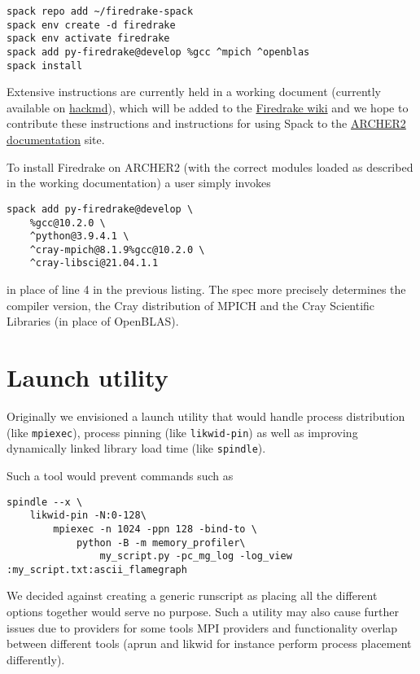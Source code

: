\documentclass[a4paper,11pt]{article}
\begin{document}
\begin{lstlisting}
spack repo add ~/firedrake-spack
spack env create -d firedrake
spack env activate firedrake
spack add py-firedrake@develop %gcc ^mpich ^openblas
spack install
\end{lstlisting}

Extensive instructions are currently held in a working document (currently available on \href{https://hackmd.io/Sg3fYXuCTl61d_LAg4QnMw}{hackmd}), which will be added to the \href{https://github.com/firedrakeproject/firedrake/wiki}{Firedrake wiki} and we hope to contribute these instructions and instructions for using Spack to the \href{https://docs.archer2.ac.uk/}{ARCHER2 documentation} site.

To install Firedrake on ARCHER2 (with the correct modules loaded as described in the working documentation) a user simply invokes
\begin{lstlisting}
spack add py-firedrake@develop \
    %gcc@10.2.0 \
    ^python@3.9.4.1 \
    ^cray-mpich@8.1.9%gcc@10.2.0 \
    ^cray-libsci@21.04.1.1
\end{lstlisting}
in place of line 4 in the previous listing.
The spec more precisely determines the compiler version, the Cray distribution of MPICH and the Cray Scientific Libraries (in place of OpenBLAS).




\clearpage
\section{Launch utility}
\label{sec:launch}
Originally we envisioned a launch utility that would handle process distribution (like \verb`mpiexec`), process pinning (like \verb`likwid-pin`) as well as improving dynamically linked library load time (like \verb`spindle`).

Such a tool would prevent commands such as
\begin{lstlisting}
spindle --x \
    likwid-pin -N:0-128\
        mpiexec -n 1024 -ppn 128 -bind-to \
            python -B -m memory_profiler\
                my_script.py -pc_mg_log -log_view :my_script.txt:ascii_flamegraph
\end{lstlisting}

We decided against creating a generic runscript as placing all the different options together would serve no purpose.
Such a utility may also cause further issues due to providers for some tools MPI providers and functionality overlap between different tools (aprun and likwid for instance perform process placement differently).
\end{document}
